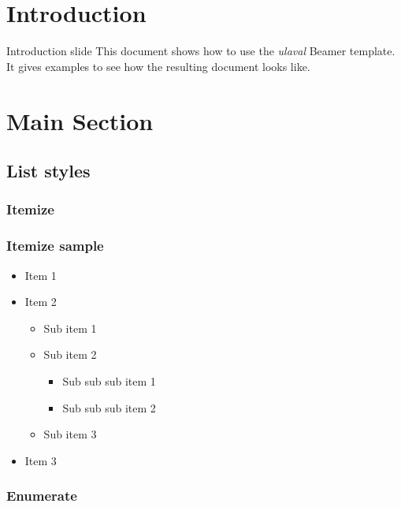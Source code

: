 




\section{Introduction}


\begin{frame}[label=intro]{Introduction slide}
	This document shows how to use the \emph{ulaval} Beamer template.
	It gives examples to see how the resulting document looks like.
\end{frame}

\section{Main Section}

\subsection{List styles}

\subsubsection{Itemize}

\begin{frame}[label=itemize]\frametitle{Itemize sample} 
	\begin{itemize}
		\item Item 1
		\item Item 2
		\begin{itemize}
			\item Sub item 1
			\item Sub item 2
			\begin{itemize}
				\item Sub sub sub item 1
				\item Sub sub sub item 2
			\end{itemize}
			\item Sub item 3
		\end{itemize}
		\item Item 3
	\end{itemize}
\end{frame}

\subsubsection{Enumerate}

